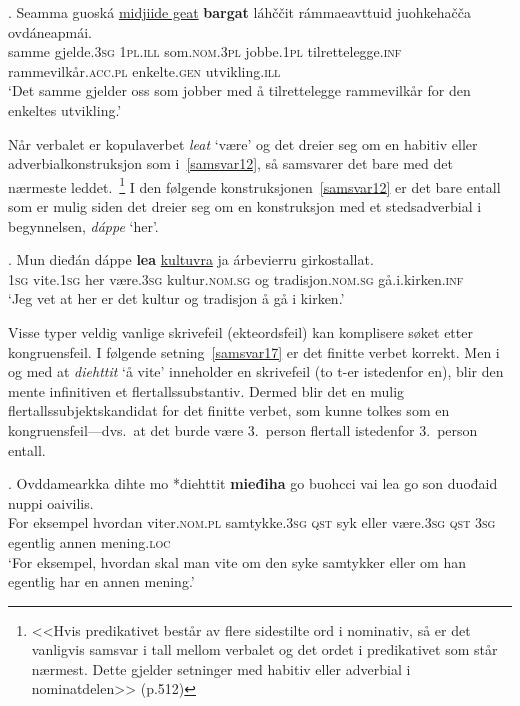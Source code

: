 \documentclass{flammie}
\begin{document}
\exg. Seamma guoská \underline{midjiide geat} \textbf{bargat} láhččit rámmaeavttuid juohkehačča ovdáneapmái.\label{samsvar15}\\
samme gjelde\textsc{.3sg} {\textsc{1pl.ill} som\textsc{.nom.3pl}} jobbe\textsc{.1pl} tilrettelegge\textsc{.inf} rammevilkår\textsc{.acc.pl} enkelte\textsc{.gen} utvikling\textsc{.ill}\\
`Det samme gjelder oss som {jobber} med å tilrettelegge rammevilkår for den enkeltes utvikling.'


Når verbalet er kopulaverbet \textit{leat} `være' og det dreier seg om en
habitiv eller adverbialkonstruksjon som i~\ref{samsvar12}, så samsvarer det bare
med det nærmeste leddet.~\cite[s.512]{Nickel1994samisk}\footnote{<<Hvis predikativet
består av flere sidestilte ord i nominativ, så er det vanligvis samsvar i tall
mellom verbalet og det ordet i predikativet som står nærmest. Dette gjelder
setninger med habitiv eller adverbial i nominatdelen>> (p.512)} I den følgende
konstruksjonen~\ref{samsvar12} er det bare entall som er mulig siden det dreier
seg om en konstruksjon med et stedsadverbial i begynnelsen, \textit{dáppe}
`her'.

\exg. Mun dieđán dáppe \textbf{lea} \underline{kultuvra} ja árbevierru girkostallat.\label{samsvar12}\\
\textsc{1sg} vite\textsc{.1sg} her være\textsc{.3sg} kultur\textsc{.nom.sg} og tradisjon\textsc{.nom.sg} gå.i.kirken\textsc{.inf}\\
`Jeg vet at her er det kultur og tradisjon å gå i kirken.'

Visse typer veldig vanlige skrivefeil (ekteordsfeil) kan komplisere søket etter
kongruensfeil.  I følgende setning~\ref{samsvar17} er det finitte verbet
korrekt.  Men i og med at \textit{diehttit} `å vite' inneholder en skrivefeil
(to t-er istedenfor en), blir den mente infinitiven et flertallssubstantiv.
Dermed blir det en mulig flertallssubjektskandidat for det finitte verbet, som
kunne tolkes som en kongruensfeil---dvs.\ at det burde være 3.\ person flertall
istedenfor 3.\ person entall.

\exg. {Ovddamearkka dihte} mo *diehttit \textbf{mieđiha} go buohcci vai lea go son duođaid nuppi oaivilis.\label{samsvar17}\\
{For eksempel} hvordan viter\textsc{.nom.pl} samtykke\textsc{.3sg} \textsc{qst} syk eller være\textsc{.3sg} \textsc{qst} \textsc{3sg} egentlig annen mening\textsc{.loc}\\
`For eksempel, hvordan skal man vite om den syke {samtykker} eller om han egentlig har en annen mening.'
\end{document}

